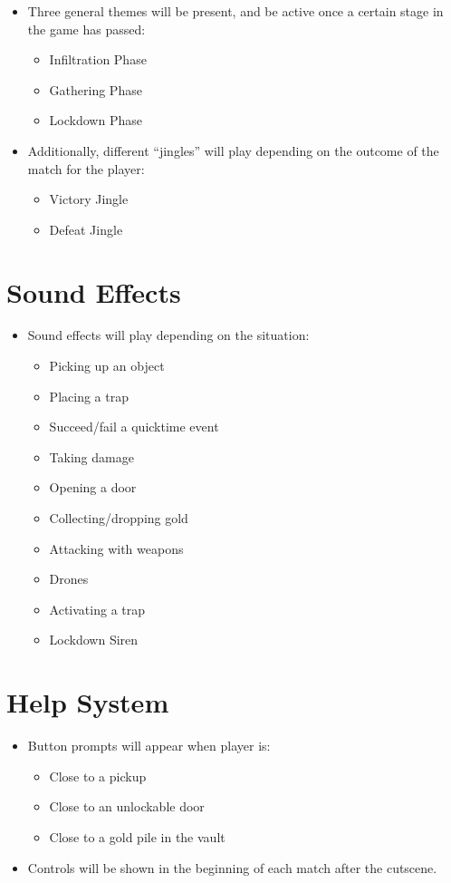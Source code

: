\documentclass[10pt]{report}
\begin{document}
\begin{itemize}
    \item Three general themes will be present, and be active once a certain stage in the game has passed:
    \begin{itemize}
        \item Infiltration Phase
        \item Gathering Phase
        \item Lockdown Phase
    \end{itemize}
    \item Additionally, different “jingles” will play depending on the outcome of the match for the player:
    \begin{itemize}
        \item Victory Jingle
        \item Defeat Jingle
    \end{itemize}
\end{itemize}

\section{Sound Effects}

\begin{itemize}
    \item Sound effects will play depending on the situation:
    \begin{itemize}
        \item Picking up an object
        \item Placing a trap
        \item Succeed/fail a quicktime event
        \item Taking damage
        \item Opening a door
        \item Collecting/dropping gold
        \item Attacking with weapons
        \item Drones
        \item Activating a trap
        \item Lockdown Siren
    \end{itemize}
\end{itemize}

\section{Help System}

\begin{itemize}
    \item Button prompts will appear when player is:
    \begin{itemize}
        \item Close to a pickup
        \item Close to an unlockable door
        \item Close to a gold pile in the vault
    \end{itemize}
    \item Controls will be shown in the beginning of each match after the cutscene.
\end{itemize}
\end{document}
